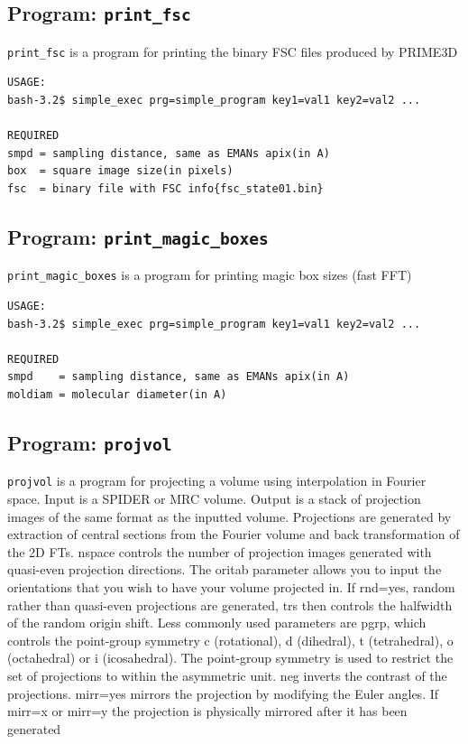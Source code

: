 \documentclass[a4paper,11pt]{article}
\newcommand{\prgname}[1]{\textcolor{NavyBlue}{\texttt{#1}}}
\begin{document}
\subsection{Program: \prgname{print\_fsc}}
\label{print_fsc}
\prgname{print\_fsc} is a program for printing the binary FSC files produced by PRIME3D

\begin{verbatim}
USAGE:
bash-3.2$ simple_exec prg=simple_program key1=val1 key2=val2 ...

REQUIRED
smpd = sampling distance, same as EMANs apix(in A)
box  = square image size(in pixels)
fsc  = binary file with FSC info{fsc_state01.bin}
\end{verbatim}

\subsection{Program: \prgname{print\_magic\_boxes}}
\label{print_magic_boxes}
\prgname{print\_magic\_boxes} is a program for printing magic box sizes (fast FFT)

\begin{verbatim}
USAGE:
bash-3.2$ simple_exec prg=simple_program key1=val1 key2=val2 ...

REQUIRED
smpd    = sampling distance, same as EMANs apix(in A)
moldiam = molecular diameter(in A)
\end{verbatim}

\subsection{Program: \prgname{projvol}}
\label{projvol}
\prgname{projvol} is a program for projecting a volume using interpolation in Fourier space. Input is a SPIDER or MRC volume. Output is a stack of projection images of the same format as the inputted volume. Projections are generated by extraction of central sections from the Fourier volume and back transformation of the 2D FTs. nspace controls the number of projection images generated with quasi-even projection directions. The oritab parameter allows you to input the orientations that you wish to have your volume projected in. If rnd=yes, random rather than quasi-even projections are generated, trs then controls the halfwidth of the random origin shift. Less commonly used parameters are pgrp, which controls the point-group symmetry c (rotational), d (dihedral), t (tetrahedral), o (octahedral) or i (icosahedral). The point-group symmetry is used to restrict the set of projections to within the asymmetric unit. neg inverts the contrast of the projections. mirr=yes mirrors the projection by modifying the Euler angles. If mirr=x or mirr=y the projection is physically mirrored after it has been generated
\end{document}
